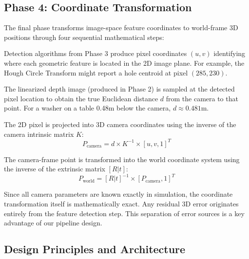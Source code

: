 \documentclass[11pt,a4paper]{article}
\begin{document}
\subsection{Phase 4: Coordinate Transformation}

The final phase transforms image-space feature coordinates to world-frame 3D positions through four sequential mathematical steps:

\begin{stepbox}
Detection algorithms from Phase 3 produce pixel coordinates $(u, v)$ identifying where each geometric feature is located in the 2D image plane. For example, the Hough Circle Transform might report a hole centroid at pixel $(285, 230)$.
\end{stepbox}

\begin{stepbox}
The linearized depth image (produced in Phase 2) is sampled at the detected pixel location to obtain the true Euclidean distance $d$ from the camera to that point. For a washer on a table 0.48m below the camera, $d \approx 0.481$m.
\end{stepbox}

\begin{stepbox}
The 2D pixel is projected into 3D camera coordinates using the inverse of the camera intrinsic matrix $K$:
\vspace{2pt}
\[ P_{\text{camera}} = d \times K^{-1} \times [u, v, 1]^T \]
\end{stepbox}

\begin{stepbox}
The camera-frame point is transformed into the world coordinate system using the inverse of the extrinsic matrix $[R|t]$:
\vspace{2pt}
\[ P_{\text{world}} = [R|t]^{-1} \times [P_{\text{camera}}, 1]^T \]
\end{stepbox}

Since all camera parameters are known exactly in simulation, the coordinate transformation itself is mathematically exact. Any residual 3D error originates entirely from the feature detection step. This separation of error sources is a key advantage of our pipeline design.

\subsection{Design Principles and Architecture}
\end{document}

